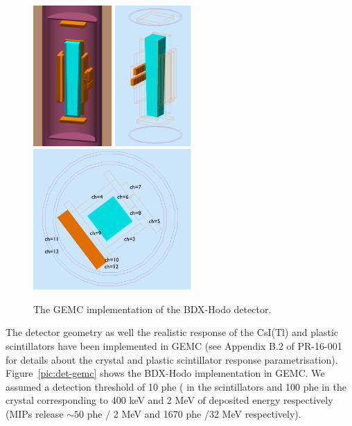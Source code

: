 \begin{figure}[h!] 
\center
\includegraphics[width=2.99cm]{figs/gemc-3d.pdf}  
\includegraphics[width=2.9cm]{figs/gemc-3d1.pdf}  
\includegraphics[width=6.0cm]{figs/gemc-3d2.pdf}  
\caption{The GEMC  implementation of the BDX-Hodo detector.}
\label{fig:det-gemc}
\end{figure}


The  detector geometry as well the realistic response of the CsI(Tl) and plastic scintillators have been implemented in GEMC (see  Appendix B.2 of PR-16-001~\cite{bdx-proposal} for details about the crystal and plastic scintillator response parametrisation). 
Figure~\ref{pic:det-gemc} shows the BDX-Hodo implementation in GEMC. 
We assumed a detection threshold of 10 phe ( in the scintillators and 100 phe in the crystal corresponding to 400 keV and 2 MeV of deposited energy respectively (MIPs release $\sim50$ phe / 2 MeV and 1670 phe /32 MeV  respectively). 


